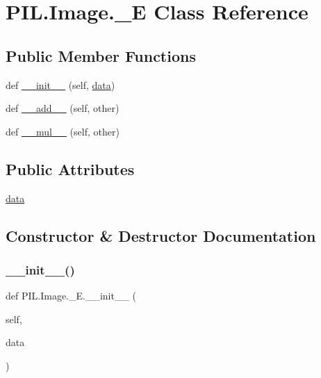 \hypertarget{classPIL_1_1Image_1_1__E}{}\section{P\+I\+L.\+Image.\+\_\+E Class Reference}
\label{classPIL_1_1Image_1_1__E}
\subsection*{Public Member Functions}
\begin{DoxyCompactItemize}
\item 
def \hyperlink{classPIL_1_1Image_1_1__E_a6faa05b979bcf3a1f36f08c588e475d7}{\+\_\+\+\_\+init\+\_\+\+\_\+} (self, \hyperlink{classPIL_1_1Image_1_1__E_ade845d24d544add9e05f9dfe6ff05f32}{data})
\item 
def \hyperlink{classPIL_1_1Image_1_1__E_aa1d179c79f12dc8d2cf001b223e34dfa}{\+\_\+\+\_\+add\+\_\+\+\_\+} (self, other)
\item 
def \hyperlink{classPIL_1_1Image_1_1__E_a8c896867731def720e7739751a2df200}{\+\_\+\+\_\+mul\+\_\+\+\_\+} (self, other)
\end{DoxyCompactItemize}
\subsection*{Public Attributes}
\begin{DoxyCompactItemize}
\item 
\hyperlink{classPIL_1_1Image_1_1__E_ade845d24d544add9e05f9dfe6ff05f32}{data}
\end{DoxyCompactItemize}


\subsection{Constructor \& Destructor Documentation}
\mbox{\label{classPIL_1_1Image_1_1__E_a6faa05b979bcf3a1f36f08c588e475d7}} 
\subsubsection{\texorpdfstring{\+\_\+\+\_\+init\+\_\+\+\_\+()}{\_\_init\_\_()}}
{\footnotesize\ttfamily def P\+I\+L.\+Image.\+\_\+\+E.\+\_\+\+\_\+init\+\_\+\+\_\+ (\begin{DoxyParamCaption}\item[{}]{self,  }\item[{}]{data }\end{DoxyParamCaption})}



